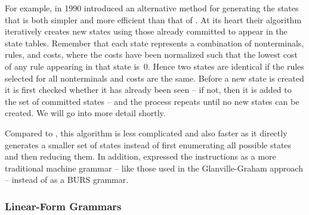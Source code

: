 {For example, in 1990 \textcite{Balachandran1990} introduced an alternative
method for generating the \glspl{state} that is both simpler and more efficient
than that of \citeauthor{Pelegri-Llopart1988}.
%
At its heart their algorithm
iteratively creates new \glspl{state} using those already committed to appear in
the \gls{state} tables.
%
Remember that each \gls{state} represents a combination
of \glspl{nonterminal}, \glspl{rule}, and costs, where the costs have been
normalized such that the lowest cost of any \gls{rule} appearing in that
\gls{state} is~0.
%
Hence two \glspl{state} are identical if the \glspl{rule}
selected for all \glspl{nonterminal} and costs are the same.
%
Before a new
\gls{state} is created it is first checked whether it has already been seen -- if
not, then it is added to the set of committed \glspl{state} -- and the process
repeats until no new \glspl{state} can be created.
%
We will go into more detail
shortly.

Compared to \citeauthor{Pelegri-Llopart1988}, this algorithm is less complicated
and also faster as it directly generates a smaller set of \glspl{state} instead
of first enumerating all possible \glspl{state} and then reducing them.
%
In
addition, \citeauthor{Balachandran1990} expressed the \glspl{instruction} as a
more traditional \gls{machine grammar} -- like those used in
the \gls{Glanville-Graham approach} -- instead of as a \gls{BURS grammar}.


\subsubsection{Linear-Form Grammars}

}
